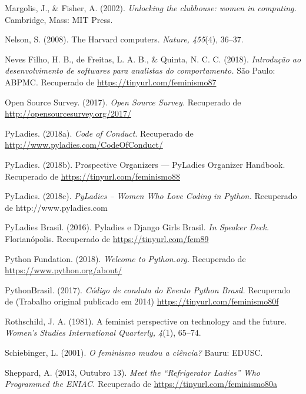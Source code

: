 \hangindent=25pt
\noindent Margolis, J., \& Fisher, A. (2002). \textit{Unlocking the clubhouse: women in computing.} Cambridge, Mass: MIT Press.

\hangindent=25pt
\noindent Nelson, S. (2008). The Harvard computers. \textit{Nature, 455}(4), 36–37.

\hangindent=25pt
\noindent Neves Filho, H. B., de Freitas, L. A. B., \& Quinta, N. C. C. (2018). \textit{Introdução ao desenvolvimento de softwares para analistas do comportamento.} São Paulo: ABPMC. Recuperado de \url{https://tinyurl.com/feminismo87}

\hangindent=25pt
\noindent Open Source Survey. (2017). \textit{Open Source Survey.} Recuperado de \url{http://opensourcesurvey.org/2017/}

\hangindent=25pt
\noindent PyLadies. (2018a). \textit{Code of Conduct}. Recuperado de \url{http://www.pyladies.com/CodeOfConduct/}

\hangindent=25pt
\noindent PyLadies. (2018b). Prospective Organizers — PyLadies Organizer Handbook. Recuperado de \url{https://tinyurl.com/feminismo88}

\hangindent=25pt
\noindent PyLadies. (2018c). \textit{PyLadies – Women Who Love Coding in Python.} Recuperado de http://www.pyladies.com

\hangindent=25pt
\noindent PyLadies Brasil. (2016). Pyladies e Django Girls Brasil. \textit{In Speaker Deck.} Florianópolis. Recuperado de \url{https://tinyurl.com/fem89}

\hangindent=25pt
\noindent Python Fundation. (2018). \textit{Welcome to Python.org.} Recuperado de \url{https://www.python.org/about/}

\hangindent=25pt
\noindent PythonBrasil. (2017). \textit{Código de conduta do Evento Python Brasil.} Recuperado de \url{} (Trabalho original publicado em 2014) \url{https://tinyurl.com/feminismo80f}

\hangindent=25pt
\noindent Rothschild, J. A. (1981). A feminist perspective on technology and the future. \textit{Women’s Studies International Quarterly, 4}(1), 65–74.

\hangindent=25pt
\noindent Schiebinger, L. (2001). \textit{O feminismo mudou a ciência?} Bauru: EDUSC.

\hangindent=25pt
\noindent Sheppard, A. (2013, Outubro 13). \textit{Meet the “Refrigerator Ladies” Who Programmed the ENIAC.} Recuperado de \url{https://tinyurl.com/feminismo80a}

